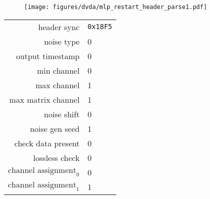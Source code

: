 \begin{figure}[h]
  \texttt{[image: figures/dvda/mlp\_restart\_header\_parse1.pdf]}
\end{figure}
\begin{table}[h]
{
  \begin{tabular}{rl}
    header sync & \texttt{0x18F5} \\
    noise type & 0 \\
    output timestamp & 0 \\
    min channel & 0 \\
    max channel & 1 \\
    max matrix channel & 1 \\
    noise shift & 0 \\
    noise gen seed & 1 \\
    check data present & 0 \\
    lossless check & 0 \\
    $\text{channel assignment}_0$ & 0 \\
    $\text{channel assignment}_1$ & 1 \\
  \end{tabular}
}
\end{table}

\clearpage

